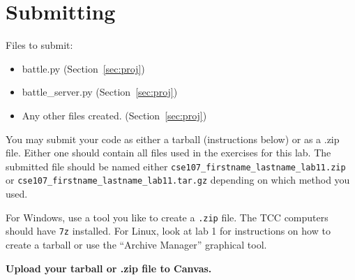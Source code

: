 \documentclass[11pt]{cselabheader}
\begin{document}
\pagebreak
\section{Submitting}

Files to submit:
\begin{itemize}
\item battle.py (Section~\ref{sec:proj})
\item battle\_server.py (Section~\ref{sec:proj})
\item Any other files created. (Section~\ref{sec:proj})
\end{itemize}

You may submit your code as either a tarball (instructions below) or as a .zip
file. Either one should contain all files used in the exercises for this lab.
The submitted file should be named either
\texttt{cse107\_firstname\_lastname\_lab11.zip} or
\texttt{cse107\_firstname\_lastname\_lab11.tar.gz} depending on which method you
used.

For Windows, use a tool you like to create a \texttt{.zip} file. The TCC
computers should have \texttt{7z} installed. For Linux, look at lab 1 for
instructions on how to create a tarball or use the ``Archive Manager'' graphical
tool.

\begin{center}
  \textbf{Upload your tarball or .zip file to Canvas.}
\end{center}
\end{document}
